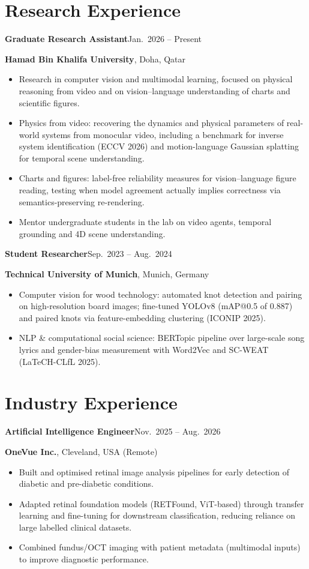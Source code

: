 \documentclass[11pt]{article}
\newcommand{\job}[4]{%
  \textbf{#1}\hfill #2\par
  \textbf{#3}, #4\par}
\begin{document}
\section{Research Experience}

\job{Graduate Research Assistant}{Jan.\ 2026 -- Present}{Hamad Bin Khalifa University}{Doha, Qatar}
\begin{itemize}
  \item Research in computer vision and multimodal learning, focused on physical reasoning from video and on
        vision--language understanding of charts and scientific figures.
  \item Physics from video: recovering the dynamics and physical parameters of real-world systems from monocular video,
        including a benchmark for inverse system identification (ECCV 2026) and motion-language Gaussian splatting
        for temporal scene understanding.
  \item Charts and figures: label-free reliability measures for vision--language figure reading, testing when model
        agreement actually implies correctness via semantics-preserving re-rendering.
  \item Mentor undergraduate students in the lab on video agents, temporal grounding and 4D scene understanding.
\end{itemize}

\job{Student Researcher}{Sep.\ 2023 -- Aug.\ 2024}{Technical University of Munich}{Munich, Germany}
\begin{itemize}
  \item Computer vision for wood technology: automated knot detection and pairing on high-resolution board images;
        fine-tuned YOLOv8 (mAP@0.5 of 0.887) and paired knots via feature-embedding clustering (ICONIP 2025).
  \item NLP \& computational social science: BERTopic pipeline over large-scale song lyrics and gender-bias measurement
        with Word2Vec and SC-WEAT (LaTeCH-CLfL 2025).
\end{itemize}

\section{Industry Experience}

\job{Artificial Intelligence Engineer}{Nov.\ 2025 -- Aug.\ 2026}{OneVue Inc.}{Cleveland, USA (Remote)}
\begin{itemize}
  \item Built and optimised retinal image analysis pipelines for early detection of diabetic and pre-diabetic conditions.
  \item Adapted retinal foundation models (RETFound, ViT-based) through transfer learning and fine-tuning for downstream
        classification, reducing reliance on large labelled clinical datasets.
  \item Combined fundus/OCT imaging with patient metadata (multimodal inputs) to improve diagnostic performance.
\end{itemize}
\end{document}
